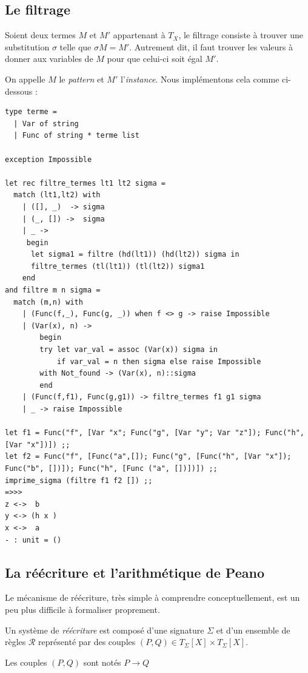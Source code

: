 \documentclass[11pt]{book}
\begin{document}
\subsection{Le filtrage}
Soient deux termes $M$ et $M'$ appartenant à $T_X$, le filtrage consiste à trouver une substitution $\sigma$
telle que $\sigma M = M'$. Autrement dit, il faut trouver les valeurs à donner aux variables de $M$ pour que celui-ci
soit égal $M'$.

On appelle $M$ le \textit{pattern} et $M'$ l'\textit{instance}.
Nous implémentons cela comme ci-dessous :
\begin{Verbatim}
type terme = 
  | Var of string
  | Func of string * terme list

exception Impossible

let rec filtre_termes lt1 lt2 sigma =
  match (lt1,lt2) with
    | ([], _)  -> sigma
    | (_, []) ->  sigma
    | _ -> 
     begin
	  let sigma1 = filtre (hd(lt1)) (hd(lt2)) sigma in
	  filtre_termes (tl(lt1)) (tl(lt2)) sigma1
    end 
and filtre m n sigma =
  match (m,n) with
	| (Func(f,_), Func(g, _)) when f <> g -> raise Impossible
	| (Var(x), n) -> 
		begin
		try let var_val = assoc (Var(x)) sigma in
			if var_val = n then sigma else raise Impossible
		with Not_found -> (Var(x), n)::sigma
		end 
	| (Func(f,f1), Func(g,g1)) -> filtre_termes f1 g1 sigma 
	| _ -> raise Impossible

let f1 = Func("f", [Var "x"; Func("g", [Var "y"; Var "z"]); Func("h", [Var "x"])]) ;;
let f2 = Func("f", [Func("a",[]); Func("g", [Func("h", [Var "x"]); Func("b", [])]); Func("h", [Func ("a", [])])]) ;;
imprime_sigma (filtre f1 f2 []) ;;
=>>>
z <->  b 
y <-> (h x )
x <->  a 
- : unit = ()
\end{Verbatim}

\subsection{La réécriture et l'arithmétique de Peano}
Le mécanisme de réécriture, très simple à comprendre conceptuellement, est un peu plus difficile
à formaliser proprement.

Un système de \textit{réécriture} est  composé d'une signature $\Sigma$ et d'un ensemble de règles
$\mathcal{R}$ représenté par des couples $(P,Q) \in T_\Sigma [X] \times  T_\Sigma [X]$.

Les couples $(P,Q)$ sont notés $P \longrightarrow Q$
\end{document}
